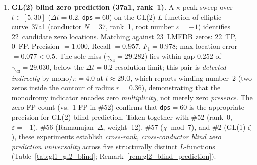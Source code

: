 \documentclass[11pt, a4paper]{article}
\theoremstyle{definition}
\theoremstyle{plain}
\begin{document}
\begin{enumerate}
        prior knowledge of zero positions (blind protocol:
        LMFDB zeros enter only in the final evaluation step).
        Matching against 17~LMFDB zeros: 16~TP, 1~FP.
        Precision $=$ Recall $= F_1 = 0.941$;
        max location error $= 0.051 < 0.5$.
        The single FP ($t \approx 28.4$) is a double-peak artefact:
        the nearest zero $\gamma_{16} = 28.684$ is correctly
        detected at $t = 28.7$; the shoulder at $t \approx 28.4$
        results from sweep resolution $\Delta t = 0.1$.
        Its mono$/\pi = 2.000$ is a precision artefact
        (\texttt{dps}$=45$; contour $r = 0.135$ encloses no zero,
        nearest distance $0.284 > r$; physical winding number~$= 0$).
        Comparison with GL(1) $\zeta$ blind prediction (\#2: 7/7 TP,
        $P = R = F_1 = 1.000$) confirms cross-rank universality of
        $\kappa$-based zero detection (see also
        Remark~\ref{rem:gl2_blind_prediction} and
        Table~\ref{tab:gl1_gl2_blind}).
        \textcolor{ForestGreen}{[confirmed 2026-04-16; GL(2) 11a1 $t\in[5,30]$; numerical verification, not proof]}
  \item \textbf{GL(2) blind zero prediction (37a1, rank~1).}
        A $\kappa$-peak sweep over $t\in[5,30]$ ($\Delta t=0.2$,
        \texttt{dps}$=60$) on the GL(2) $L$-function of elliptic
        curve~37a1 (conductor $N=37$, rank~1, root number
        $\varepsilon=-1$) identifies 22~candidate zero locations.
        Matching against 23~LMFDB zeros: 22~TP, 0~FP.
        Precision $= 1.000$, Recall $= 0.957$, $F_1 = 0.978$;
        max location error $= 0.077 < 0.5$.
        The sole miss ($\gamma_{24}=29.282$) lies within gap $0.252$
        of $\gamma_{23}=29.030$, below the $\Delta t=0.2$ resolution
        limit; this pair is \emph{detected indirectly} by
        mono$/\pi = 4.0$ at $t\approx 29.0$, which reports
        winding number~2 (two zeros inside the contour of radius $r=0.36$),
        demonstrating that the monodromy indicator encodes zero
        \emph{multiplicity}, not merely zero \emph{presence}.
        The zero FP count (vs.\ 1 FP in \#52) confirms that
        \texttt{dps}$=60$ is the appropriate precision for GL(2)
        blind prediction.
        Taken together with \#52 (rank~0, $\varepsilon=+1$), \#56
        (Ramanujan~$\Delta$, weight~12), \#57 ($\chi\bmod 7$),
        and \#2 (GL(1) $\zeta$), these experiments establish
        \emph{cross-rank, cross-conductor blind zero prediction
        universality} across five structurally distinct $L$-functions
        (Table~\ref{tab:gl1_gl2_blind};
        Remark~\ref{rem:gl2_blind_prediction}).

\end{enumerate}
\end{document}
